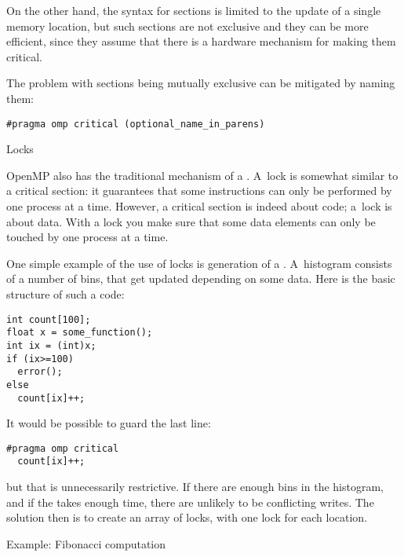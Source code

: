 On the other hand, the syntax for  sections is limited to the update
of a single memory location, but such sections
are not exclusive and they can be more efficient, since they assume that there is a hardware
mechanism for making them critical.

The problem with  sections being mutually exclusive can be mitigated by naming them:
\begin{verbatim}
#pragma omp critical (optional_name_in_parens)
\end{verbatim}

 {Locks}

OpenMP also has the traditional mechanism of a . A~lock is somewhat similar to 
a critical section: it guarantees that some instructions can only be performed by one
process at a time. However, a critical section is indeed about code; a~lock is about data.
With a lock you make sure that some data elements can only be touched by one process at a time.

One simple example of the use of locks is generation of a .
A~histogram consists of a number of bins, that get updated depending on some data.
Here is the basic structure of such a code:
\begin{verbatim}
int count[100];
float x = some_function();
int ix = (int)x;
if (ix>=100)
  error();
else
  count[ix]++;
\end{verbatim}
It would be possible to guard the last line:
\begin{verbatim}
#pragma omp critical
  count[ix]++;
\end{verbatim}
but that is unnecessarily restrictive. If there are enough bins in the
histogram, and if the  takes enough time, there are unlikely to be
conflicting writes. The solution then is to create an array of locks, with
one lock for each  location.

 {Example: Fibonacci computation}

